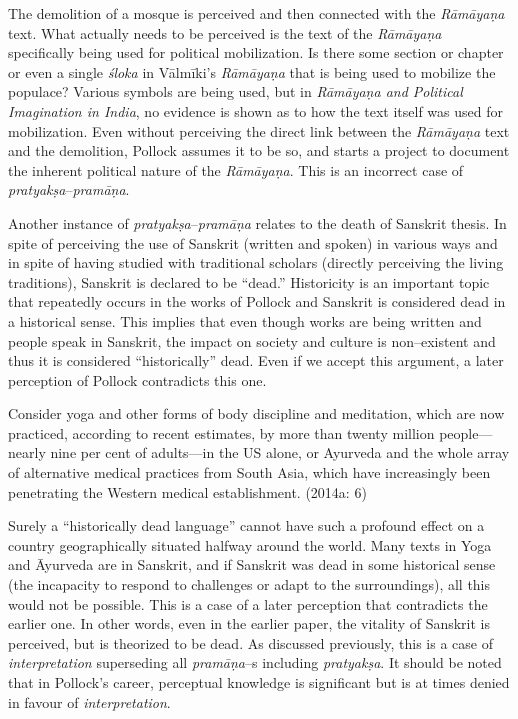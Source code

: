 The demolition of a mosque is perceived and then connected with the \textit{Rāmāyaṇa} text. What actually needs to be perceived is the text of the \textit{Rāmāyaṇa }specifically being used for political mobilization. Is there some section or chapter or even a single \textit{śloka} in Vālmīki’s \textit{Rāmāyaṇa} that is being used to mobilize the populace? Various symbols are being used, but in \textit{Rāmāyaṇa and Political Imagination in India}, no evidence is shown as to how the text itself was used for mobilization. Even without perceiving the direct link between the \textit{Rāmāyaṇa }text and the demolition, Pollock assumes it to be so, and starts a project to document the inherent political nature of the \textit{Rāmāyaṇa}. This is an incorrect case of \textit{pratyakṣa}–\textit{pramāṇa}.

Another instance of \textit{pratyakṣa}–\textit{pramāṇa }relates to the death of Sanskrit thesis. In spite of perceiving the use of Sanskrit (written and spoken) in various ways and in spite of having studied with traditional scholars (directly perceiving the living traditions), Sanskrit is declared to be “dead.” Historicity is an important topic that repeatedly occurs in the works of Pollock and Sanskrit is considered dead in a historical sense. This implies that even though works are being written and people speak in Sanskrit, the impact on society and culture is non–existent and thus it is considered “historically” dead. Even if we accept this argument, a later perception of Pollock contradicts this one.

\begin{myquote}
Consider yoga and other forms of body discipline and meditation, which are now practiced, according to recent estimates, by more than twenty million people—nearly nine per cent of adults—in the US alone, or Ayurveda and the whole array of alternative medical practices from South Asia, which have increasingly been penetrating the Western medical establishment. (2014a: 6)
\end{myquote}

Surely a “historically dead language” cannot have such a profound effect on a country geographically situated halfway around the world. Many texts in Yoga and Āyurveda are in Sanskrit, and if Sanskrit was dead in some historical sense (the incapacity to respond to challenges or adapt to the surroundings), all this would not be possible. This is a case of a later perception that contradicts the earlier one. In other words, even in the earlier paper, the vitality of Sanskrit is perceived, but is theorized to be dead. As discussed previously, this is a case of \textit{interpretation} superseding all \textit{pramāṇa}–s including\textit{ pratyakṣa}. It should be noted that in Pollock’s career, perceptual knowledge is significant but is at times denied in favour of \textit{interpretation}.

